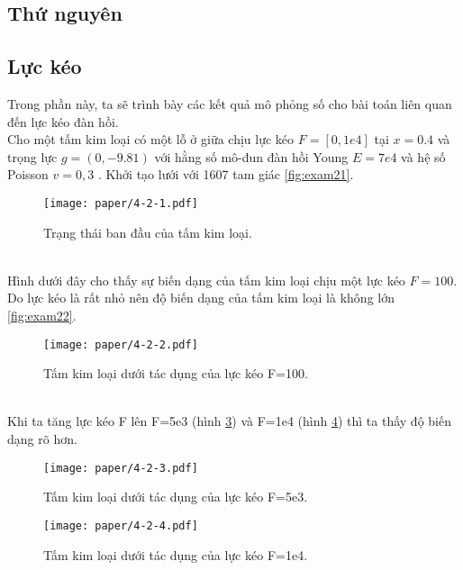 \subsection{Thứ nguyên}
\subsection{Lực kéo}
Trong phần này, ta sẽ trình bày các kết quả mô phỏng số cho bài toán liên quan đến lực kéo đàn hồi.\\
Cho một tấm kim loại có một lỗ ở giữa chịu lực kéo $F=[0,1e4]$ tại $x=0.4$ và trọng lực $g=(0,-9.81)$ với hằng số mô-đun đàn hồi Young $E=7e4$ và hệ số Poisson $v=0,3$ \cite{TIT-07}. Khởi tạo lưới với 1607 tam giác \eqref{fig:exam21}.\\
\begin{figure}[http]
\centering
\texttt{[image: paper/4-2-1.pdf]}
\caption{Trạng thái ban đầu của tấm kim loại.}
\label{fig:exam21}
\end{figure}\\
Hình dưới đây cho thấy sự biến dạng của tấm kim loại chịu một lực kéo $F = 100$. Do lực kéo là rất nhỏ nên độ biến dạng của tấm kim loại là không lớn \eqref{fig:exam22}.\\
\begin{figure}[http]
\centering
\texttt{[image: paper/4-2-2.pdf]}
\caption{Tấm kim loại dưới tác dụng của lực kéo F=100.}
\label{fig:exam22}
\end{figure}\\
Khi ta tăng lực kéo F lên F=5e3 (hình \ref{fig:exam23}) và F=1e4 (hình \ref{fig:exam24}) thì ta thấy độ biến dạng rõ hơn.\\
\begin{figure}[http]
\centering
\texttt{[image: paper/4-2-3.pdf]}
\caption{Tấm kim loại dưới tác dụng của lực kéo F=5e3.}
\label{fig:exam23}
\end{figure}
\begin{figure}[http]
\centering
\texttt{[image: paper/4-2-4.pdf]}
\caption{Tấm kim loại dưới tác dụng của lực kéo F=1e4.}
\label{fig:exam24}
\end{figure}
